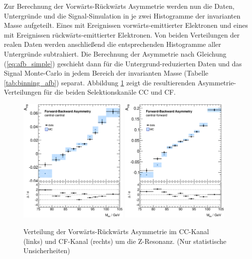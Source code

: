 Zur Berechnung der Vorwärts-Rückwärts Asymmetrie werden nun die Daten,
Untergründe und die Signal-Simulation in je zwei
Histogramme der invarianten Masse aufgeteilt. Eines mit Ereignissen
vorwärts-emittierter Elektronen und eines mit Ereignissen rückwärts-emittierter
Elektronen. Von beiden Verteilungen der realen Daten werden anschließend die
entsprechenden Histogramme aller Untergründe subtrahiert. Die Berechnung der
Asymmetrie nach Gleichung (\ref{eq:afb_simple}) geschieht dann für die
Untergrund-reduzierten Daten und das Signal Monte-Carlo in jedem Bereich der
invarianten Masse (Tabelle \ref{tab:binning_afb}) separat. Abbildung
\ref{fig:afb_raw} zeigt die resultierenden Asymmetrie-Verteilungen für die
beiden Selektionskanäle \ac{CC} und \ac{CF}.

\begin{figure}
    \centering
    \includegraphics[width=0.48\textwidth]{plots/afb_cc}
    \hfill
    \includegraphics[width=0.48\textwidth]{plots/afb_cf}
    \caption[Verteilung der Vorwärts-Rückwärts Asymmetrie im \ac{CC}-Kanal
        und \ac{CF}-Kanal]
        {Verteilung der Vorwärts-Rückwärts Asymmetrie im \ac{CC}-Kanal
        (links) und \ac{CF}-Kanal (rechts) um die Z-Resonanz. (Nur statistische
        Unsicherheiten)}
    \label{fig:afb_raw}
\end{figure}

